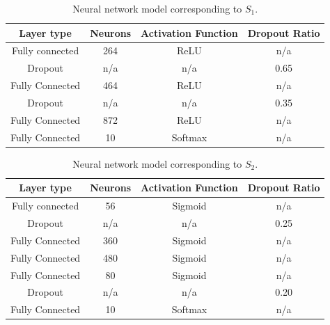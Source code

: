 \documentclass[preprint,12pt]{elsarticle}%
\begin{document}
\setcounter{table}{0}

\begin{table}[H]
\begin{center}
\caption{Neural network model corresponding to $S_1$.}
\label{table:neural_network_model_S1}
\vspace{12pt}
\begin{tabular}{| c | c | c | c |}
\hline
Layer type & Neurons & Activation Function & Dropout Ratio \\
\hline
Fully connected & 264 & ReLU & n/a \\
Dropout & n/a & n/a & 0.65 \\
Fully Connected & 464 & ReLU & n/a\\
Dropout & n/a & n/a & 0.35\\
Fully Connected & 872 & ReLU & n/a\\
Fully Connected & 10 & Softmax & n/a\\
\hline
\end{tabular}
\end{center}

\end{table}

\begin{table}[H]
\begin{center}
\caption{Neural network model corresponding to $S_2$.}
\label{table:neural_network_model_S2}
\vspace{12pt}
\begin{tabular}{| c | c | c | c |}
\hline
Layer type & Neurons & Activation Function & Dropout Ratio \\
\hline
Fully connected & 56 & Sigmoid & n/a \\
Dropout & n/a & n/a & 0.25 \\
Fully Connected & 360 & Sigmoid & n/a\\
Fully Connected & 480 & Sigmoid & n/a\\
Fully Connected & 80 & Sigmoid & n/a\\
Dropout & n/a & n/a & 0.20\\
Fully Connected & 10 & Softmax & n/a\\
\hline
\end{tabular}
\end{center}

\end{table}
\end{document}
